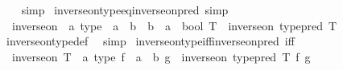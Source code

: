 \begin{isabellebody}
%
\isadelimproof
\ \ %
\endisadelimproof
%
\isatagproof
{}\isamarkupfalse%
\ simp%
\endisatagproof
{\isafoldproof}%
%
\isadelimproof
\isanewline
%
\endisadelimproof
\isanewline
{}\isamarkupfalse%
\ inverse{\isacharunderscore}{\kern0pt}on{\isacharunderscore}{\kern0pt}type{\isacharunderscore}{\kern0pt}eq{\isacharunderscore}{\kern0pt}inverse{\isacharunderscore}{\kern0pt}on{\isacharunderscore}{\kern0pt}pred\ {\isacharbrackleft}{\kern0pt}simp{\isacharbrackright}{\kern0pt}{\isacharcolon}{\kern0pt}\isanewline
\ \ {\isachardoublequoteopen}{\isacharparenleft}{\kern0pt}inverse{\isacharunderscore}{\kern0pt}on\ {\isacharcolon}{\kern0pt}{\isacharcolon}{\kern0pt}\ {\isacharprime}{\kern0pt}a\ type\ {\isasymRightarrow}\ {\isacharparenleft}{\kern0pt}{\isacharprime}{\kern0pt}a\ {\isasymRightarrow}\ {\isacharprime}{\kern0pt}b{\isacharparenright}{\kern0pt}\ {\isasymRightarrow}\ {\isacharparenleft}{\kern0pt}{\isacharprime}{\kern0pt}b\ {\isasymRightarrow}\ {\isacharprime}{\kern0pt}a{\isacharparenright}{\kern0pt}\ {\isasymRightarrow}\ bool{\isacharparenright}{\kern0pt}\ T\ {\isacharequal}{\kern0pt}\ inverse{\isacharunderscore}{\kern0pt}on\ {\isacharparenleft}{\kern0pt}type{\isacharunderscore}{\kern0pt}pred\ T{\isacharparenright}{\kern0pt}{\isachardoublequoteclose}\isanewline
%
\isadelimproof
\ \ %
\endisadelimproof
%
\isatagproof
{}\isamarkupfalse%
\ inverse{\isacharunderscore}{\kern0pt}on{\isacharunderscore}{\kern0pt}type{\isacharunderscore}{\kern0pt}def\ \isamarkupfalse%
\ simp%
\endisatagproof
{\isafoldproof}%
%
\isadelimproof
\isanewline
%
\endisadelimproof
\isanewline
{}\isamarkupfalse%
\ inverse{\isacharunderscore}{\kern0pt}on{\isacharunderscore}{\kern0pt}type{\isacharunderscore}{\kern0pt}iff{\isacharunderscore}{\kern0pt}inverse{\isacharunderscore}{\kern0pt}on{\isacharunderscore}{\kern0pt}pred\ {\isacharbrackleft}{\kern0pt}iff{\isacharbrackright}{\kern0pt}{\isacharcolon}{\kern0pt}\isanewline
\ \ {\isachardoublequoteopen}inverse{\isacharunderscore}{\kern0pt}on\ {\isacharparenleft}{\kern0pt}T\ {\isacharcolon}{\kern0pt}{\isacharcolon}{\kern0pt}\ {\isacharprime}{\kern0pt}a\ type{\isacharparenright}{\kern0pt}\ {\isacharparenleft}{\kern0pt}f\ {\isacharcolon}{\kern0pt}{\isacharcolon}{\kern0pt}\ {\isacharprime}{\kern0pt}a\ {\isasymRightarrow}\ {\isacharprime}{\kern0pt}b{\isacharparenright}{\kern0pt}\ g\ {\isasymlongleftrightarrow}\ inverse{\isacharunderscore}{\kern0pt}on\ {\isacharparenleft}{\kern0pt}type{\isacharunderscore}{\kern0pt}pred\ T{\isacharparenright}{\kern0pt}\ f\ g{\isachardoublequoteclose}\isanewline

\end{isabellebody}
